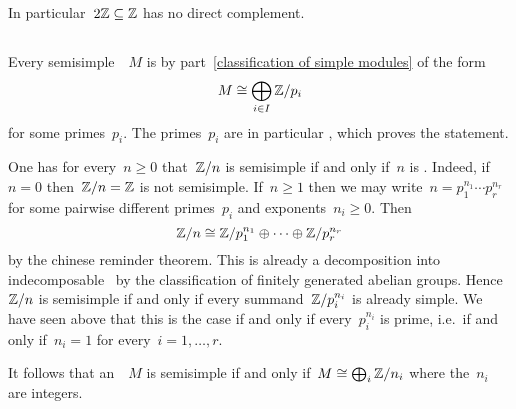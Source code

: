 In particular~$2 \mathbb{Z} \subseteq \mathbb{Z}$ has no direct complement.





\subsection{}

Every semisimple~~$M$ is by part~\ref{classification of simple modules} of the form
\[
  M \cong \bigoplus_{i \in I} \mathbb{Z}/p_i
\]
for some primes~$p_i$.
The primes~$p_i$ are in particular , which proves the statement.


\begin{remark}
  One has for every~$n \geq 0$ that~$\mathbb{Z}/n$ is semisimple if and only if~$n$ is .
  Indeed, if~$n = 0$ then~$\mathbb{Z}/n = \mathbb{Z}$ is not semisimple.
  If~$n \geq 1$ then we may write~$n = p_1^{n_1} \dotsm p_r^{n_r}$ for some pairwise different primes~$p_i$ and exponents~$n_i \geq 0$.
  Then
  \[
          \mathbb{Z}/n
    \cong \mathbb{Z}/p_1^{n_1} \oplus \dotsb \oplus \mathbb{Z}/p_r^{n_r}
  \]
  by the chinese reminder theorem.
  This is already a decomposition into indecomposable~{\modules{$\Integer$}} by the classification of finitely generated abelian groups.
  Hence~$\mathbb{Z}/n$ is semisimple if and only if every summand~$\mathbb{Z}/p_i^{n_i}$ is already simple.
  We have seen above that this is the case if and only if every~$p_i^{n_i}$ is prime, i.e.\ if and only if~$n_i = 1$ for every~$i = 1, \dotsc, r$.
  
  It follows that an~{\module{$\Integer$}}~$M$ is semisimple if and only if~$M \cong \bigoplus_i \mathbb{Z}/n_i$ where the~$n_i$ are  integers.
\end{remark}


